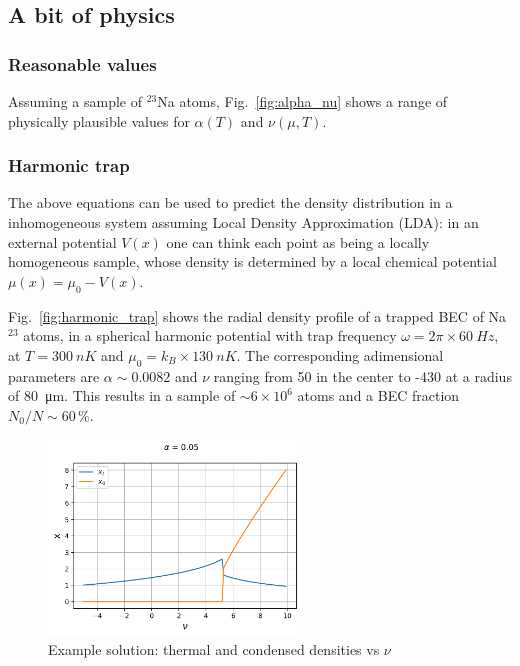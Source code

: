 \documentclass{article}
\begin{document}
\subsection*{A bit of physics}
\subsubsection*{Reasonable values}

Assuming a sample of $^{23}$Na atoms, Fig.~\ref{fig:alpha_nu} shows a range of physically plausible values for $\alpha(T)$ and $\nu(\mu, T)$.

\subsubsection*{Harmonic trap}

The above equations can be used to predict the density distribution in a inhomogeneous system assuming Local Density Approximation (LDA): in an external potential $V(x)$ one can think each point as being a locally homogeneous sample, whose density is determined by a local chemical potential $\mu(x) = \mu_0 - V(x)$.

Fig.~\ref{fig:harmonic_trap} shows the radial density profile of a trapped BEC of Na$^{23}$ atoms, in a spherical harmonic potential with trap frequency $\omega = 2 \pi \times \SI{60}{Hz}$, at $T = \SI{300}{nK}$ and $\mu_0 = k_B\times\SI{130}{nK}$. The corresponding adimensional parameters are $\alpha \sim 0.0082$ and $\nu$ ranging from 50 in the center to -430 at a radius of \SI{80}{\micro m}. This results in a sample of $\sim 6\times 10^6$ atoms and a BEC fraction $N_0/N \sim 60\,\%$.


\begin{figure}
  \centering
  \includegraphics[width=0.6\textwidth]{figures/fig_n_mu}
  \caption{Example solution: thermal and condensed densities vs $\nu$}
  \label{fig:solution}
\end{figure}
\end{document}
